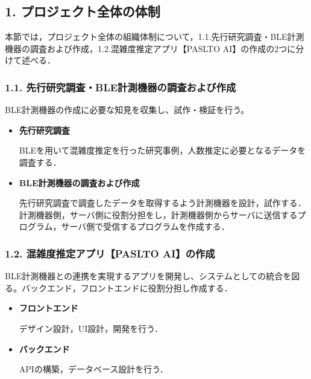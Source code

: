 \subsection*{1. プロジェクト全体の体制}
本節では，プロジェクト全体の組織体制について，1.1.先行研究調査・BLE計測機器の調査および作成，1.2.混雑度推定アプリ【PASLTO AI】の作成の2つに分けて述べる．

\subsubsection*{1.1. 先行研究調査・BLE計測機器の調査および作成}
BLE計測機器の作成に必要な知見を収集し、試作・検証を行う。
\begin{itemize}
	\item {\bfseries 先行研究調査}
	
	BLEを用いて混雑度推定を行った研究事例，人数推定に必要となるデータを調査する．
	\item {\bfseries BLE計測機器の調査および作成}
	
	先行研究調査で調査したデータを取得するよう計測機器を設計，試作する．
	計測機器側，サーバ側に役割分担をし，計測機器側からサーバに送信するプログラム，サーバ側で受信するプログラムを作成する．
\end{itemize}


\subsubsection*{1.2. 混雑度推定アプリ【PASLTO AI】の作成}
BLE計測機器との連携を実現するアプリを開発し、システムとしての統合を図る。バックエンド，フロントエンドに役割分担し作成する．
\begin{itemize}
	\item {\bfseries フロントエンド}
	
	デザイン設計，UI設計，開発を行う．
	\item {\bfseries バックエンド}
	
	APIの構築，データベース設計を行う．
\end{itemize}

